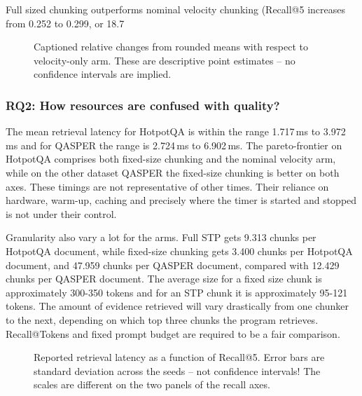 \documentclass[10pt,a4paper]{article}
\begin{document}
Full sized chunking outperforms nominal velocity chunking (Recall@5 increases from 0.252 to 0.299, or 18.7%

\begin{figure}[!htbp]
\centering

\caption{Captioned relative changes from rounded means with respect to velocity-only arm. These are descriptive point estimates – no confidence intervals are implied.}
\label{fig:deltas}
\end{figure}

\subsubsection{RQ2: How resources are confused with quality?}

The mean retrieval latency for HotpotQA is within the range 1.717\,ms to 3.972\,ms and for QASPER the range is 2.724\,ms to 6.902\,ms. The pareto-frontier on HotpotQA comprises both fixed-size chunking and the nominal velocity arm, while on the other dataset QASPER the fixed-size chunking is better on both axes. These timings are not representative of other times. Their reliance on hardware, warm-up, caching and precisely where the timer is started and stopped is not under their control.

Granularity also vary a lot for the arms. Full STP gets 9.313 chunks per HotpotQA document, while fixed-size chunking gets 3.400 chunks per HotpotQA document, and 47.959 chunks per QASPER document, compared with 12.429 chunks per QASPER document. The average size for a fixed size chunk is approximately 300-350 tokens and for an STP chunk it is approximately 95-121 tokens. The amount of evidence retrieved will vary drastically from one chunker to the next, depending on which top three chunks the program retrieves. Recall@Tokens and fixed prompt budget are required to be a fair comparison.

\begin{figure}[!htbp]
\centering

\caption{Reported retrieval latency as a function of Recall@5. Error bars are standard deviation across the seeds – not confidence intervals! The scales are different on the two panels of the recall axes.}
\label{fig:pareto}
\end{figure}
\end{document}
